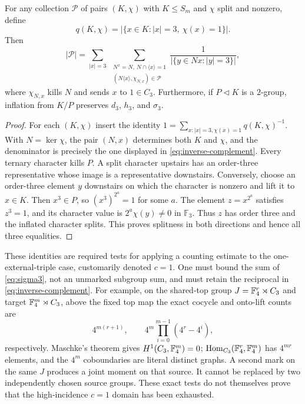 \begin{proposition}\label{prop:c1-incidence}
For any collection $\mathcal P$ of pairs $(K,\chi)$ with $K\leq S_m$
and $\chi$ split and nonzero, define
\[
 q(K,\chi)=|\{x\in K:|x|=3,\ \chi(x)=1\}|.
\]
Then
\begin{equation}\label{eq:inverse-complement}
 |\mathcal P|=\sum_{|x|=3}\ 
 \sum_{\substack{N^x=N,\ N\cap\langle x\rangle=1\\
          (N\langle x\rangle,\chi_{N,x})\in\mathcal P}}
 \frac1{|\{y\in Nx:|y|=3\}|},
\end{equation}
where $\chi_{N,x}$ kills $N$ and sends $x$ to $1\in C_3$.
Furthermore, if $P\lhd K$ is a $2$-group, inflation from $K/P$
preserves $d_3$, $h_3$, and $\sigma_3$.
\end{proposition}
\begin{proof}
For each $(K,\chi)$ insert the identity
$1=\sum_{x:|x|=3,\chi(x)=1}q(K,\chi)^{-1}$.
With $N=\ker\chi$, the pair $(N,x)$ determines both $K$ and $\chi$,
and the denominator is precisely the one displayed in
\eqref{eq:inverse-complement}. Every ternary character kills $P$.
A split character upstairs has an order-three representative whose
image is a representative downstairs. Conversely, choose an order-three
element $y$ downstairs on which the character is nonzero and lift it to
$x\in K$. Then $x^3\in P$, so $(x^3)^{2^a}=1$ for some $a$.
The element $z=x^{2^a}$ satisfies $z^3=1$, and its character value is
$2^a\chi(y)\ne0$ in $\mathbb F_3$. Thus $z$ has order three and
the inflated character splits. This proves splitness in both directions
and hence all three equalities.
\end{proof}

These identities are required tests for applying a counting estimate to
the one-external-triple case, customarily denoted $c=1$. One must bound
the sum of \eqref{eq:sigma3}, not an unmarked subgroup sum, and must
retain the reciprocal in \eqref{eq:inverse-complement}. For example,
on the shared-top group $J=\mathbb F_4^r\rtimes C_3$ and target
$\mathbb F_4^m\rtimes C_3$, above the fixed top map the exact cocycle and
onto-lift counts are
\[
 4^{m(r+1)},\qquad 4^m\prod_{i=0}^{m-1}(4^r-4^i),
\]
respectively. Maschke's theorem gives $H^1(C_3,\mathbb F_4^m)=0$;
$\operatorname{Hom}_{C_3}(\mathbb F_4^r,\mathbb F_4^m)$ has $4^{mr}$ elements, and the
$4^m$ coboundaries are literal distinct graphs. A second mark on the
same $J$ produces a joint moment on that source. It cannot be replaced
by two independently chosen source groups. These exact tests do not
themselves prove that the high-incidence $c=1$ domain has been exhausted.

